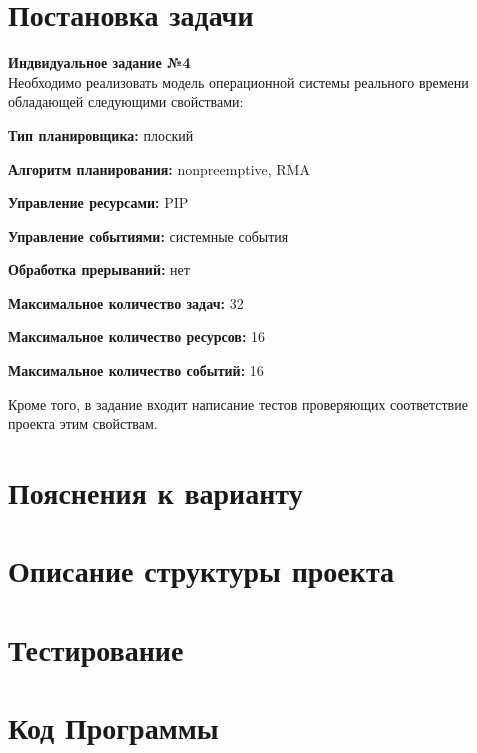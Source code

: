 \documentclass[12pt, a4paper]{article}
\begin{document}


\tableofcontents
\newpage

\section{Постановка задачи}

\textbf{Индвидуальное задание №4} \\
Необходимо реализовать модель операционной системы реального времени обладающей следующими свойствами:

\noindent
\textbf{Тип планировщика:} плоский

\noindent
\textbf{Алгоритм планирования:} nonpreemptive, RMA

\noindent
\textbf{Управление ресурсами:} PIP

\noindent
\textbf{Управление событиями:} системные события

\noindent
\textbf{Обработка прерываний:} нет

\noindent
\textbf{Максимальное количество задач:} 32

\noindent
\textbf{Максимальное количество ресурсов:} 16

\noindent
\textbf{Максимальное количество событий:} 16

\noindent
Кроме того, в задание входит написание тестов проверяющих соответствие проекта этим свойствам.
\newpage

\section{Пояснения к варианту}

\newpage

\section{Описание структуры проекта}

\newpage

\section{Тестирование}

\newpage

\section*{Код Программы}
%
\inputminted[label=global.cpp]{c++}{../global.cpp}
\inputminted[label=defs.h]{c++}{../defs.h}
\inputminted[label=rtos\_api.h]{c++}{../rtos_api.h}
\inputminted[label=sys.h]{c++}{../sys.h}
\inputminted[label=events.cpp]{c++}{../events.cpp}
\inputminted[label=resource.cpp]{c++}{../resource.cpp}
\inputminted[label=task.cpp]{c++}{../task.cpp}
\inputminted[label=test.cpp]{c++}{../test.cpp}
\end{document}
